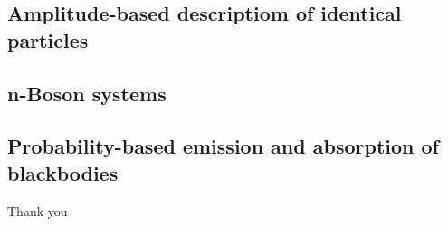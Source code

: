\documentclass[aspectratio=169]{beamer}
\begin{document}
\subsection{Amplitude-based descriptiom of identical particles}

\subsection{n-Boson systems}

\subsection{Probability-based emission and absorption of blackbodies}

\begin{frame}{}
	\begin{center}
{\Large Thank you}
	\end{center}
\end{frame}
\end{document}
